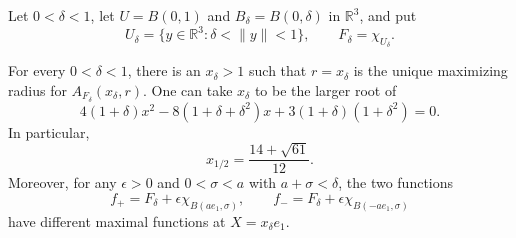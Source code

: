 \documentclass[12pt]{amsart}
\numberwithin{equation}{section}
\begin{document}
Let $0<\delta<1$, let $U=B(0,1)$ and $B_\delta=B(0,\delta)$ in
$\mathbb{R}^3$, and put
\[
U_\delta=\{y\in\mathbb{R}^3:\delta<\|y\|<1\},
\qquad F_\delta=\chi_{U_\delta}.
\]

\begin{proposition}
\label{three_dimensional_shell_obstruction}
For every $0<\delta<1$, there is an $x_\delta>1$ such that
$r=x_\delta$ is the unique maximizing radius for
$A_{F_\delta}(x_\delta,r)$. One can take $x_\delta$ to be the larger
root of
\begin{equation}
\label{three_dimensional_shell_root}
4(1+\delta)x^2-8(1+\delta+\delta^2)x
       +3(1+\delta)(1+\delta^2)=0.
\end{equation}
In particular,
\[
x_{1/2}=\frac{14+\sqrt{61}}{12}.
\]
Moreover, for any $\epsilon>0$ and $0<\sigma<a$ with $a+\sigma<\delta$,
the two functions
\[
f_+=F_\delta+\epsilon\chi_{B(ae_1,\sigma)},
\qquad
f_-=F_\delta+\epsilon\chi_{B(-ae_1,\sigma)}
\]
have different maximal functions at $X=x_\delta e_1$.
\end{proposition}
\end{document}
